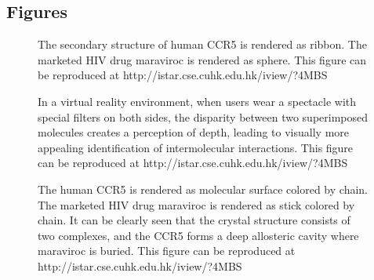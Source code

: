 \documentclass[twocolumn]{bmcart}%
\begin{document}
\begin{backmatter}




\section*{Figures}
  \begin{figure}[h!]
  \caption{
      The secondary structure of human CCR5 is rendered as ribbon. The marketed HIV drug maraviroc is rendered as sphere. This figure can be reproduced at http://istar.cse.cuhk.edu.hk/iview/?4MBS
}\label{fig:ribbon}
      \end{figure}

  \begin{figure}[h!]
  \caption{
      In a virtual reality environment, when users wear a spectacle with special filters on both sides, the disparity between two superimposed molecules creates a perception of depth, leading to visually more appealing identification of intermolecular interactions. This figure can be reproduced at http://istar.cse.cuhk.edu.hk/iview/?4MBS
}\label{fig:anaglyph}
      \end{figure}

  \begin{figure}[h!]
  \caption{
      The human CCR5 is rendered as molecular surface colored by chain. The marketed HIV drug maraviroc is rendered as stick colored by chain. It can be clearly seen that the crystal structure consists of two complexes, and the CCR5 forms a deep allosteric cavity where maraviroc is buried. This figure can be reproduced at http://istar.cse.cuhk.edu.hk/iview/?4MBS}\label{fig:surface}
      \end{figure}


\end{backmatter}
\end{document}
